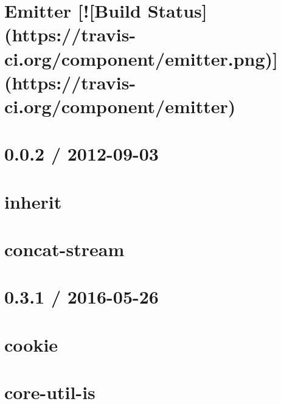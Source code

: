 \documentclass[twoside]{book}
\newcommand{\+}{\discretionary{\mbox{\scriptsize$\hookleftarrow$}}{}{}}
\begin{document}
\chapter{Emitter \mbox{[}!\mbox{[}Build Status\mbox{]}(https\+://travis-\/ci.org/component/emitter.png)\mbox{]}(https\+://travis-\/ci.org/component/emitter)}
\label{md_app_web_node_modules_component-emitter__readme}

\chapter{0.0.2 / 2012-\/09-\/03}
\label{md_app_web_node_modules_component-inherit__history}

\chapter{inherit}
\label{md_app_web_node_modules_component-inherit__readme}

\chapter{concat-\/stream}
\label{md_app_web_node_modules_concat-stream_readme}

\chapter{0.3.1 / 2016-\/05-\/26}
\label{md_app_web_node_modules_cookie__h_i_s_t_o_r_y}

\chapter{cookie}
\label{md_app_web_node_modules_cookie__r_e_a_d_m_e}

\chapter{core-\/util-\/is}
\label{md_app_web_node_modules_core-util-is__r_e_a_d_m_e}

\end{document}
